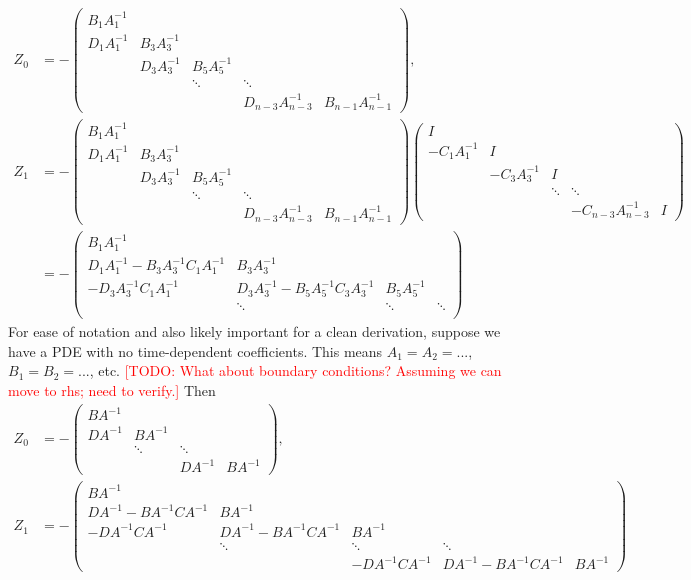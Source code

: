 \documentclass[a4paper,12pt]{article}
\makeatletter
\newcommand{\todo}[1]{\textcolor{red}{[TODO\@: #1]}}
\makeatother
\begin{document}
%
{\footnotesize
\begin{align*}
Z_0 & = -
\begin{pmatrix}
	B_{1}A_1^{-1} \\ 
	D_1A_1^{-1} & B_3A_3^{-1} \\
	& D_3A_3^{-1} & B_5A_5^{-1} \\
	&& \ddots & \ddots \\
	&& & D_{n-3}A_{n-3}^{-1} & B_{n-1}A_{n-1}^{-1}
\end{pmatrix}, \\
Z_1& = -
\begin{pmatrix}
	B_{1}A_1^{-1} \\ 
	D_1A_1^{-1} & B_3A_3^{-1} \\
	& D_3A_3^{-1} & B_5A_5^{-1} \\
	&& \ddots & \ddots \\
	&& & D_{n-3}A_{n-3}^{-1} & B_{n-1}A_{n-1}^{-1}
\end{pmatrix}
\begin{pmatrix}
	I \\ 
	-C_1A_1^{-1} & I \\
	& -C_3A_3^{-1} & I \\
	& & \ddots & \ddots  \\
	& & & -C_{n-3}A_{n-3}^{-1} & I
\end{pmatrix} \\
& = -
\begin{pmatrix}
	B_{1}A_1^{-1} \\ 
	D_1A_1^{-1} - B_3A_3^{-1}C_1A_1^{-1} & B_3A_3^{-1} \\
	-D_3A_3^{-1}C_1A_1^{-1} & D_3A_3^{-1} - B_5A_5^{-1}C_3A_3^{-1} & B_5A_5^{-1} \\
	& \ddots & \ddots & \ddots \\
\end{pmatrix}
\end{align*}
}%
For ease of notation and also likely important for a clean derivation, suppose we have a PDE with no
time-dependent coefficients. This means $A_1 = A_2 = ...$, $B_1 = B_2 = ...$, etc. \todo{What about
boundary conditions? Assuming we can move to rhs; need to verify.} Then
%
\begin{align*}
Z_0 & = -
\begin{pmatrix}
	BA^{-1} \\ 
	DA^{-1} & BA^{-1} \\
	& \ddots & \ddots \\
	& & DA^{-1} & BA^{-1}
\end{pmatrix}, \\
Z_1 & = -
\begin{pmatrix}
	BA^{-1} \\ 
	DA^{-1} - BA^{-1}CA^{-1} & BA^{-1} \\
	-DA^{-1}CA^{-1} & DA^{-1} - BA^{-1}CA^{-1} & BA^{-1} \\
	& \ddots & \ddots & \ddots \\
	& & -DA^{-1}CA^{-1} & DA^{-1} - BA^{-1}CA^{-1} & BA^{-1}
\end{pmatrix}
\end{align*}
\end{document}
